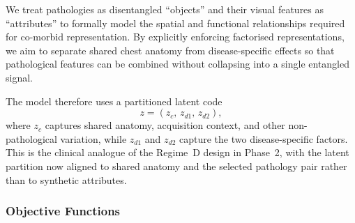We treat pathologies as disentangled ``objects'' and their visual features as ``attributes'' to formally model the spatial and functional relationships required for co-morbid representation.
By explicitly enforcing factorised representations, we aim to separate shared chest anatomy from disease-specific effects so that pathological features can be combined without collapsing into a single entangled signal.

The model therefore uses a partitioned latent code
\begin{equation}
    z = (z_c,\, z_{d1},\, z_{d2}),
\end{equation}
where $z_c$ captures shared anatomy, acquisition context, and other non-pathological variation, while $z_{d1}$ and $z_{d2}$ capture the two disease-specific factors.
This is the clinical analogue of the Regime~D design in Phase~2, with the latent partition now aligned to shared anatomy and the selected pathology pair rather than to synthetic attributes.

\subsubsection{Objective Functions}

